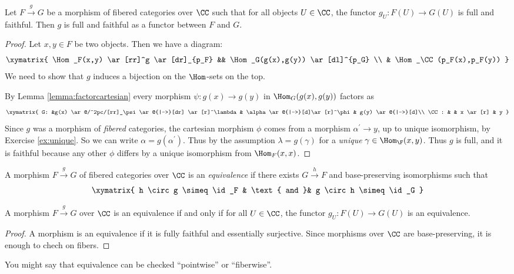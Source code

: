 \documentclass[11pt, english]{article}
\begin{document}
\begin{lemma}
Let $F \xrightarrow{g} G$ be a morphism of fibered categories over $\CC$ such that for all objects $U \in \CC$, the functor $g_U:F(U) \to G(U)$ is full and faithful. Then $g$ is full and faithful as a functor between $F$ and $G$.
\end{lemma}

\begin{proof}
Let $x,y \in F$ be two objects. Then we have a diagram:
\[
\xymatrix{
\Hom_F(x,y) \ar[rr]^g \ar[dr]_{p_F} && \Hom_G(g(x),g(y)) \ar[dl]^{p_G} \\
& \Hom_\CC(p_F(x),p_F(y))
}
\]
We need to show that $g$ induces a bijection on the $\Hom$-sets on the top.

By Lemma \ref{lemma:factorcartesian} every morphism $\psi:g(x) \to g(y)$ in $\Hom_G(g(x),g(y))$ factors as
\[
\xymatrix{
G: &g(x) \ar@/^2pc/[rr]_\psi \ar@{|->}[dr] \ar[r]^\lambda & \alpha \ar@{|->}[d]\ar[r]^\phi & g(y) \ar@{|->}[d]\\
\CC: & & x \ar[r] & y
}
\]
Since $g$ was a morphism of \emph{fibered} categories, the cartesian morphism $\phi$ comes from a morphism $\alpha^\prime \to y$, up to unique isomorphism, by Exercise \ref{ex:unique}. So we can write $\alpha=g(\alpha^\prime)$. Thus by the assumption $\lambda=g(\gamma)$ for a \emph{unique} $\gamma \in \Hom_\F(x,y)$. Thus $g$ is full, and it is faithful because any other $\phi$ differs by a unique isomorphism from $\Hom_F(x,x)$.
\end{proof}

\begin{defi}
A morphism $F \xrightarrow{g} G$ of fibered categories over $\CC$ is an \emph{equivalence} if there exists $G \xrightarrow{h} F$ and base-preserving isomorphisms such that
\[
\xymatrix{
h \circ g \simeq \id_F & \text{ and }& g \circ h \simeq \id_G
}
\]
\end{defi}

\begin{prop}
\label{prop:fiberedequivalence} 
A morphism $F \xrightarrow{g} G$ over $\CC$ is an equivalence if and only if for all $U \in \CC$, the functor $g_U:F(U) \to G(U)$ is an equivalence.
\end{prop}
\begin{proof}
A morphism is an equivalence if it is fully faithful and essentially surjective. Since morphisms over $\CC$ are base-preserving, it is enough to chech on fibers.
\end{proof}
\begin{remark}
You might say that equivalence can be checked ``pointwise'' or ``fiberwise''.
\end{remark}
\end{document}
